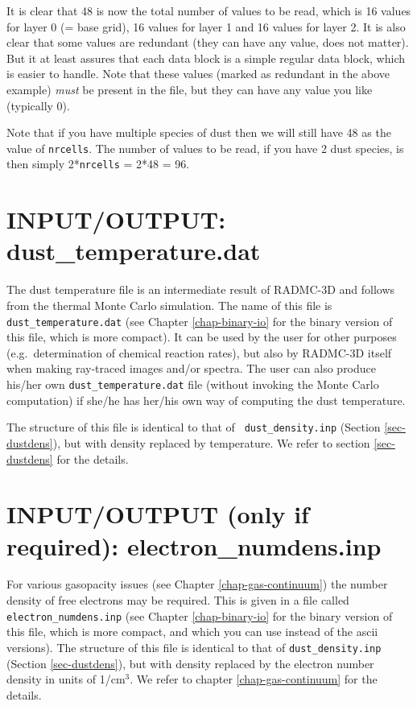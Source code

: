 \documentclass{report}
\begin{document}
It is clear that 48 is now the total number of values to be read, which is
16 values for layer 0 (= base grid), 16 values for layer 1 and 16 values
for layer 2. It is also clear that some values are redundant (they can
have any value, does not matter). But it at least assures that each data
block is a simple regular data block, which is easier to handle. Note that
these values (marked as redundant in the above example) {\em must} be 
present in the file, but they can have any value you like (typically 0).

Note that if you have multiple species of dust then we will still have
48 as the value of {\small\tt nrcells}. The number of values to be read,
if you have 2 dust species, is then simply 2*{\small\tt nrcells} = 2*48 = 96.



\section{INPUT/OUTPUT: dust\_temperature.dat}
The dust temperature file is an intermediate result of RADMC-3D and follows
from the thermal Monte Carlo simulation. The name of this file is {\small\tt
  dust\_temperature.dat} (see Chapter \ref{chap-binary-io} for the binary
version of this file, which is more compact). It can be used by the user for
other purposes (e.g.\ determination of chemical reaction rates), but also by
RADMC-3D itself when making ray-traced images and/or spectra. The user can
also produce his/her own {\small\tt dust\_temperature.dat} file (without
invoking the Monte Carlo computation) if she/he has her/his own way of
computing the dust temperature.

The structure of this file is identical to that of {\small\tt
  dust\_density.inp} (Section \ref{sec-dustdens}), but with density replaced
by temperature. We refer to section \ref{sec-dustdens} for the details.



\section{INPUT/OUTPUT (only if required): electron\_numdens.inp}
For various gasopacity issues (see Chapter \ref{chap-gas-continuum}) the
number density of free electrons may be required. This is given in a file
called {\small\tt electron\_numdens.inp} (see Chapter \ref{chap-binary-io}
for the binary version of this file, which is more compact, and which you
can use instead of the ascii versions).  The structure of this file is
identical to that of {\small\tt dust\_density.inp} (Section
\ref{sec-dustdens}), but with density replaced by the electron number
density in units of 1/cm$^3$. We refer to chapter \ref{chap-gas-continuum}
for the details. 
\end{document}
